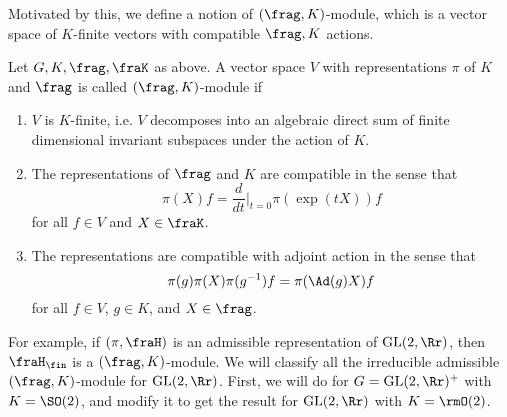 Motivated by this, we define a notion of $(\frag, K)$-module, which is a vector space of $K$-finite vectors with compatible $\frag, K$ actions.
\begin{definition}
Let $G, K, \frag, \fraK$ as above. A vector space $V$ with representations $\pi$ of $K$ and $\frag$ is called $(\frag, K)$-module if
\begin{enumerate}
\item $V$ is $K$-finite, i.e. $V$ decomposes into an algebraic direct sum of finite dimensional invariant subspaces under the action of $K$. 
\item The representations of $\frag$ and $K$ are compatible in the sense that 
$$
\pi(X)f = \frac{d}{dt}\Big|_{t=0} \pi(\exp(tX))f
$$
for all $f\in V$ and $X\in \fraK$. 
\item The representations are compatible with adjoint action in the sense that
$$
\pi(g) \pi(X)\pi(g^{-1}) f = \pi(\Ad(g)X)f
$$
for all $f\in V$, $g\in K$, and $X\in \frag$.
\end{enumerate}
\end{definition}


For example, if $(\pi, \fraH)$ is an admissible representation of $\GL(2, \Rr)$, then $\fraH_{\fin}$ is a $(\frag, K)$-module. 
We will classify all the irreducible admissible $(\frag, K)$-module for $\GL(2, \Rr)$.
First, we will do for $G = \GL(2, \Rr)^{+}$ with $K = \SO(2)$, and modify it to get the result for $\GL(2, \Rr)$ with $K = \rmO(2)$. 

